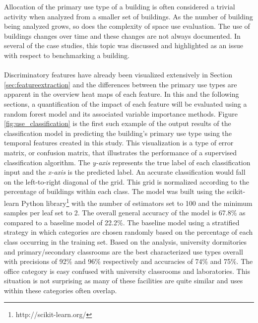 Allocation of the primary use type of a building is often considered a trivial activity when analyzed from a smaller set of buildings. As the number of building being analyzed grows, so does the complexity of space use evaluation. The use of buildings changes over time and these changes are not always documented. In several of the case studies, this topic was discussed and highlighted as an issue with respect to benchmarking a building.\\
\\
Discriminatory features have already been visualized extensively in Section \ref{sec:featureextraction} and the differences between the primary use types are apparent in the overview heat maps of each feature. In this and the following sections, a quantification of the impact of each feature will be evaluated using a random forest model and its associated variable importance methods. Figure \ref{fig:use_classification} is the first such example of the output results of the classification model in predicting the building's primary use type using the temporal features created in this study. This visualization is a type of error matrix, or confusion matrix, that illustrates the performance of a supervised classification algorithm. The \emph{y-axis} represents the true label of each classification input and the \emph{x-axis} is the predicted label. An accurate classification would fall on the left-to-right diagonal of the grid. This grid is normalized according to the percentage of buildings within each class. The model was built using the scikit-learn Python library\footnote{http://scikit-learn.org/} with the number of estimators set to 100 and the minimum samples per leaf set to 2. The overall general accuracy of the model is 67.8\% as compared to a baseline model of 22.2\%. The baseline model using a stratified strategy in which categories are chosen randomly based on the percentage of each class occurring in the training set. Based on the analysis, university dormitories and primary/secondary classrooms are the best characterized use types overall with precisions of 92\% and 96\% respectively and accuracies of 74\% and 75\%. The office category is easy confused with university classrooms and laboratories. This situation is not surprising as many of these facilities are quite similar and uses within these categories often overlap. 